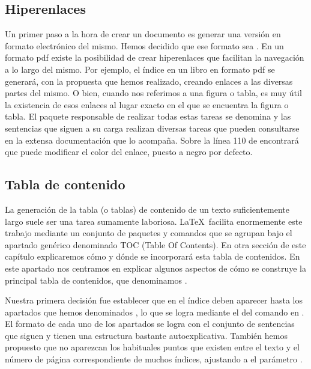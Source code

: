 \subsection{Hiperenlaces}
Un primer paso a la hora de crear un documento es generar una versión en formato electrónico del mismo. Hemos decidido que ese formato sea  . En un formato pdf existe la posibilidad de crear hiperenlaces que facilitan la navegación a lo largo del mismo. Por ejemplo, el índice en un libro en formato pdf se generará, con la propuesta que hemos realizado, creando enlaces a las diversas partes del mismo. O bien, cuando nos referimos a una figura o tabla, es muy útil la existencia de esos enlaces al lugar exacto en el que se encuentra la figura o tabla.  El paquete responsable de realizar todas estas tareas se denomina  y las sentencias que siguen a su carga realizan diversas tareas que pueden consultarse en la extensa documentación que lo acompaña. Sobre la línea 110 de  encontrará que puede modificar el color del enlace, puesto a negro por defecto.

\subsection{Tabla de contenido}
La generación de la tabla (o tablas) de contenido de un texto suficientemente largo suele ser una tarea sumamente laboriosa. \LaTeX\ facilita enormemente este trabajo mediante un conjunto de paquetes y comandos que se agrupan bajo el apartado genérico denominado TOC (Table Of Contents). En otra sección de este capítulo explicaremos cómo y dónde se incorporará esta tabla de contenidos. En este apartado nos centramos en explicar algunos aspectos de cómo se construye la principal tabla de contenidos, que denominamos  .

Nuestra primera decisión fue establecer que en el índice deben aparecer hasta los apartados que hemos denominados , lo que se logra mediante el  del comando  en . El formato de cada uno de los apartados se logra con el conjunto de sentencias que siguen y tienen una estructura bastante autoexplicativa. También hemos propuesto que no aparezcan los habituales puntos que existen entre el texto y el número de página correspondiente de muchos índices, ajustando a  el parámetro \ttcolor{\textbackslash@dotsep}. 

